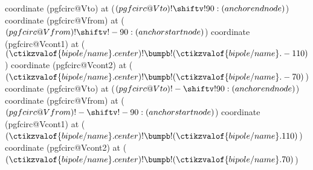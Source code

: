{    \ifpgf@circuit@bipole@voltage@below
        coordinate (pgfcirc@Vto) at ($(pgfcirc@Vto) ! \shiftv!90 :  (anchorendnode)$)
        coordinate (pgfcirc@Vfrom) at ($(pgfcirc@Vfrom) ! \shiftv!-90 :  (anchorstartnode)$)
        coordinate (pgfcirc@Vcont1) at ($(\ctikzvalof{bipole/name}.center) ! \bumpb ! (\ctikzvalof{bipole/name}.-110)$)
        coordinate (pgfcirc@Vcont2) at ($(\ctikzvalof{bipole/name}.center) ! \bumpb ! (\ctikzvalof{bipole/name}.-70)$)
    \else
        coordinate (pgfcirc@Vto) at ($(pgfcirc@Vto) ! -\shiftv!90 :  (anchorendnode)$)
        coordinate (pgfcirc@Vfrom) at ($(pgfcirc@Vfrom) ! -\shiftv!-90 :  (anchorstartnode)$)
        coordinate (pgfcirc@Vcont1) at ($(\ctikzvalof{bipole/name}.center) ! \bumpb ! (\ctikzvalof{bipole/name}.110)$)
        coordinate (pgfcirc@Vcont2) at ($(\ctikzvalof{bipole/name}.center) ! \bumpb ! (\ctikzvalof{bipole/name}.70)$)
    \fi

}
